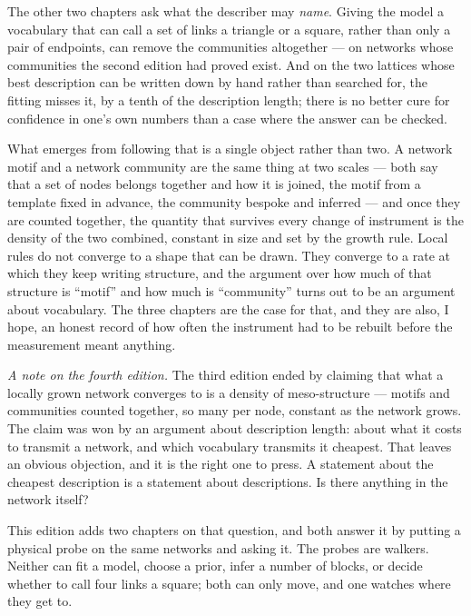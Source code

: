 \documentclass[10pt]{book}
\begin{document}
The other two chapters ask what the describer may \emph{name}. Giving the model a
vocabulary that can call a set of links a triangle or a square, rather than only
a pair of endpoints, can remove the communities altogether --- on networks whose
communities the second edition had proved exist. And on the two lattices whose
best description can be written down by hand rather than searched for, the
fitting misses it, by a tenth of the description length; there is no better cure
for confidence in one's own numbers than a case where the answer can be checked.

What emerges from following that is a single object rather than two. A network
motif and a network community are the same thing at two scales --- both say that
a set of nodes belongs together and how it is joined, the motif from a template
fixed in advance, the community bespoke and inferred --- and once they are
counted together, the quantity that survives every change of instrument is the
density of the two combined, constant in size and set by the growth rule. Local
rules do not converge to a shape that can be drawn. They converge to a rate at
which they keep writing structure, and the argument over how much of that
structure is ``motif'' and how much is ``community'' turns out to be an argument
about vocabulary. The three chapters are the case for that, and they are also, I
hope, an honest record of how often the instrument had to be rebuilt before the
measurement meant anything.

\emph{A note on the fourth edition.} The third edition ended by claiming that what a
locally grown network converges to is a density of meso-structure --- motifs and
communities counted together, so many per node, constant as the network grows. The
claim was won by an argument about description length: about what it costs to transmit
a network, and which vocabulary transmits it cheapest. That leaves an obvious
objection, and it is the right one to press. A statement about the cheapest
description is a statement about descriptions. Is there anything in the network
itself?

This edition adds two chapters on that question, and both answer it by putting a physical probe on
the same networks and asking it. The probes are walkers. Neither can fit a model,
choose a prior, infer a number of blocks, or decide whether to call four links a
square; both can only move, and one watches where they get to.
\end{document}

